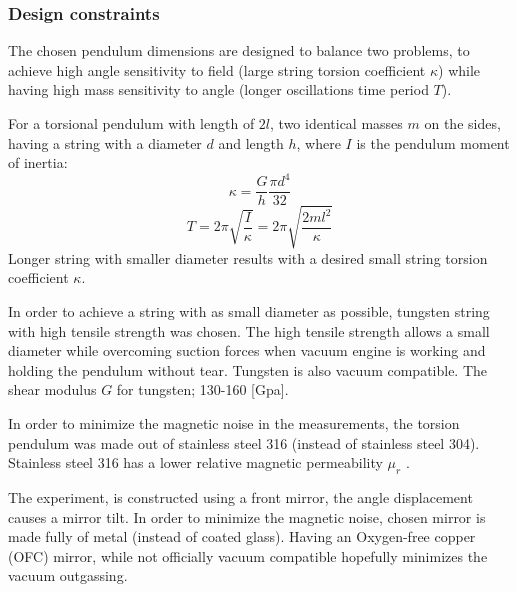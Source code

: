 \documentclass[\main/master.tex]{subfiles}
\begin{document}
\subsubsection{Design constraints}
\par\noindent
The chosen pendulum dimensions are designed to balance two problems, to achieve high angle sensitivity to field (large string torsion coefficient $\kappa$) while having high mass sensitivity to angle (longer oscillations time period $T$). 
\par\noindent
For a torsional pendulum with length of $2l$, two identical masses $m$ on the sides, having a string with a diameter $d$ and length $h$, where $I$ is the pendulum moment of inertia:
\begin{equation}
\kappa = \frac{G}{h} \frac{\pi d^4}{32}    \label{eqn:torsion_coefficient}
\end{equation}
\begin{equation}
T = 2\pi\sqrt{\frac{I}{\kappa}}= 2\pi\sqrt{\frac{2ml^2}{\kappa}}   \label{eqn:undamped_motion_equation}
\end{equation}
Longer string with smaller diameter results with a desired small string torsion coefficient $\kappa$. 
\par\noindent
In order to achieve a string with as small diameter as possible, tungsten string with high tensile strength was chosen. The high tensile strength allows a small diameter while overcoming suction forces when vacuum engine is working and holding the pendulum without tear. Tungsten is also vacuum compatible. The shear modulus $G$ for tungsten; 130-160 [Gpa]\cite{tungsten}.
\par\noindent
In order to minimize the magnetic noise in the measurements, the torsion pendulum was made out of stainless steel 316 (instead of stainless steel 304). Stainless steel 316 has a lower relative magnetic permeability $\mu_r$ \cite{SS316}.
\par\noindent
The experiment, is constructed using a front mirror, the angle displacement causes a mirror tilt. In order to minimize the magnetic noise, chosen mirror is made fully of metal (instead of coated glass). Having an Oxygen-free copper (OFC) mirror, while not officially vacuum compatible hopefully minimizes the vacuum outgassing.
\end{document}
